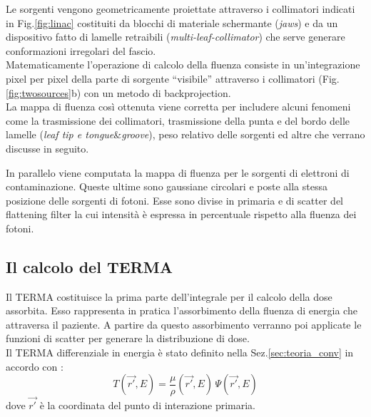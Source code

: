 {Le sorgenti vengono geometricamente proiettate attraverso i collimatori indicati in Fig.\ref{fig:linac} costituiti da blocchi di materiale schermante (\textit{jaws}) e da un dispositivo fatto di lamelle retraibili (\textit{multi-leaf-collimator}) che serve generare conformazioni irregolari del fascio.\\
Matematicamente l'operazione di calcolo della fluenza consiste in un'integrazione pixel per pixel della parte di sorgente \textquotedblleft visibile\textquotedblright{} attraverso i collimatori (Fig.\ref{fig:twosources}b) con un metodo di backprojection.\\
La mappa di fluenza così ottenuta viene corretta per includere alcuni fenomeni come la trasmissione dei collimatori, trasmissione della punta e del bordo delle lamelle (\textit{leaf tip e tongue}\&\textit{groove}), peso relativo delle sorgenti ed altre che verrano discusse in seguito.

In parallelo viene computata la mappa di fluenza per le sorgenti di elettroni di contaminazione. Queste ultime sono gaussiane circolari e poste alla stessa posizione delle sorgenti di fotoni. Esse sono divise in primaria e di scatter del flattening filter la cui intensità è espressa in percentuale rispetto alla fluenza dei fotoni.

\subsection{Il calcolo del TERMA}
Il TERMA costituisce la prima parte dell'integrale per il calcolo della dose assorbita. Esso rappresenta in pratica l'assorbimento della fluenza di energia che attraversa il paziente. A partire da questo assorbimento verranno poi applicate le funzioni di scatter per generare la distribuzione di dose.\\
Il TERMA differenziale in energia è stato definito nella Sez.\ref{sec:teoria_conv} in accordo con \cite{Ahnesjo1999}:
\begin{equation}
\label{eq:termaE}
T(\vec{r'},E) = \frac{\mu}{\rho}(\vec{r'},E)\,\Psi(\vec{r'},E)
\end{equation}
dove $\vec{r'}$ è la coordinata del punto di interazione primaria.

}
